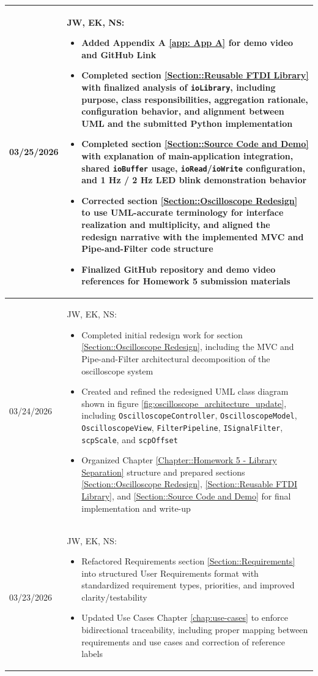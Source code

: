 \begin{longtable}{|l||p{13.5cm}|}
03/25/2026 & 
JW, EK, NS:
\begin{itemize}[topsep=0pt,itemsep=0pt,parsep=0pt,partopsep=0pt,leftmargin=12pt]
\item Added Appendix A \ref{app: App A} for demo video and GitHub Link
\item Completed section \ref{Section::Reusable FTDI Library} with finalized analysis of \texttt{ioLibrary}, including purpose, class responsibilities, aggregation rationale, configuration behavior, and alignment between UML and the submitted Python implementation
\item Completed section \ref{Section::Source Code and Demo} with explanation of main-application integration, shared \texttt{ioBuffer} usage, \texttt{ioRead}/\texttt{ioWrite} configuration, and 1 Hz / 2 Hz LED blink demonstration behavior
\item Corrected section \ref{Section::Oscilloscope Redesign} to use UML-accurate terminology for interface realization and multiplicity, and aligned the redesign narrative with the implemented MVC and Pipe-and-Filter code structure
\item Finalized GitHub repository and demo video references for Homework 5 submission materials
\end{itemize}
\\ \hline

03/24/2026 & 
JW, EK, NS:
\begin{itemize}[topsep=0pt,itemsep=0pt,parsep=0pt,partopsep=0pt,leftmargin=12pt]
\item Completed initial redesign work for section \ref{Section::Oscilloscope Redesign}, including the MVC and Pipe-and-Filter architectural decomposition of the oscilloscope system
\item Created and refined the redesigned UML class diagram shown in figure \ref{fig:oscilloscope_architecture_update}, including \texttt{OscilloscopeController}, \texttt{OscilloscopeModel}, \texttt{OscilloscopeView}, \texttt{FilterPipeline}, \texttt{ISignalFilter}, \texttt{scpScale}, and \texttt{scpOffset}
\item Organized Chapter \ref{Chapter::Homework 5 - Library Separation} structure and prepared sections \ref{Section::Oscilloscope Redesign}, \ref{Section::Reusable FTDI Library}, and \ref{Section::Source Code and Demo} for final implementation and write-up
\end{itemize}
\\ \hline

03/23/2026 & 
JW, EK, NS:
\begin{itemize}[topsep=0pt,itemsep=0pt,parsep=0pt,partopsep=0pt,leftmargin=12pt]
\item Refactored Requirements section \ref{Section::Requirements} into structured User Requirements format with standardized requirement types, priorities, and improved clarity/testability
\item Updated Use Cases Chapter \ref{chap:use-cases} to enforce bidirectional traceability, including proper mapping between requirements and use cases and correction of reference labels
\end{itemize}
\\ \hline


\end{longtable}
